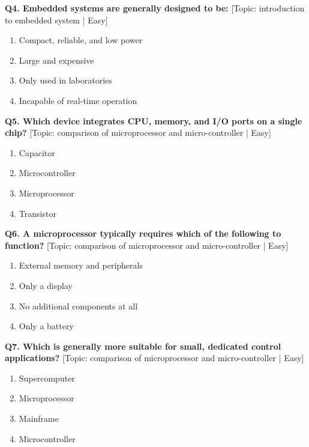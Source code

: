 \noindent\textbf{Q4. Embedded systems are generally designed to be:} \hfill [Topic: introduction to embedded system | Easy]
\begin{enumerate}[label=(\alph*),topsep=2pt,itemsep=1pt,partopsep=0pt,parsep=0pt]
    \item {Compact, reliable, and low power}
    \item {Large and expensive}
    \item {Only used in laboratories}
    \item {Incapable of real-time operation}
\end{enumerate}
\vspace{2mm}

\noindent\textbf{Q5. Which device integrates CPU, memory, and I/O ports on a single chip?} \hfill [Topic: comparison of microprocessor and micro-controller | Easy]
\begin{enumerate}[label=(\alph*),topsep=2pt,itemsep=1pt,partopsep=0pt,parsep=0pt]
    \item {Capacitor}
    \item {Microcontroller}
    \item {Microprocessor}
    \item {Transistor}
\end{enumerate}
\vspace{2mm}

\noindent\textbf{Q6. A microprocessor typically requires which of the following to function?} \hfill [Topic: comparison of microprocessor and micro-controller | Easy]
\begin{enumerate}[label=(\alph*),topsep=2pt,itemsep=1pt,partopsep=0pt,parsep=0pt]
    \item {External memory and peripherals}
    \item {Only a display}
    \item {No additional components at all}
    \item {Only a battery}
\end{enumerate}
\vspace{2mm}

\noindent\textbf{Q7. Which is generally more suitable for small, dedicated control applications?} \hfill [Topic: comparison of microprocessor and micro-controller | Easy]
\begin{enumerate}[label=(\alph*),topsep=2pt,itemsep=1pt,partopsep=0pt,parsep=0pt]
    \item {Supercomputer}
    \item {Microprocessor}
    \item {Mainframe}
    \item {Microcontroller}
\end{enumerate}
\vspace{2mm}

